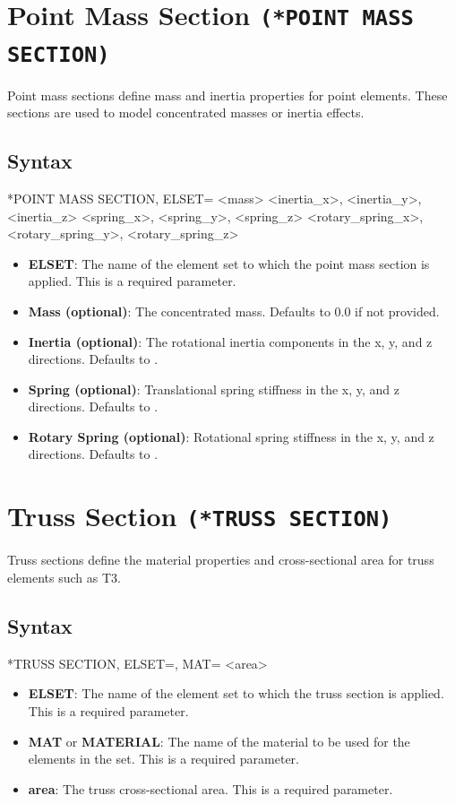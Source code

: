\section{Point Mass Section \texttt{(*POINT MASS SECTION)}}
Point mass sections define mass and inertia properties for point elements. These sections are used to model concentrated masses or inertia effects.

\subsection{Syntax}
\begin{codeBlock}
*POINT MASS SECTION, ELSET=
<mass>
<inertia_x>, <inertia_y>, <inertia_z>
<spring_x>, <spring_y>, <spring_z>
<rotary_spring_x>, <rotary_spring_y>, <rotary_spring_z>
\end{codeBlock}

\begin{itemize}
\item \textbf{ELSET}: The name of the element set to which the point mass section is applied. This is a required parameter.
\item \textbf{Mass (optional)}: The concentrated mass. Defaults to 0.0 if not provided.
\item \textbf{Inertia (optional)}: The rotational inertia components in the x, y, and z directions. Defaults to .
\item \textbf{Spring (optional)}: Translational spring stiffness in the x, y, and z directions. Defaults to .
\item \textbf{Rotary Spring (optional)}: Rotational spring stiffness in the x, y, and z directions. Defaults to .
\end{itemize}

\section{Truss Section \texttt{(*TRUSS SECTION)}}
Truss sections define the material properties and cross-sectional area for truss elements such as T3.

\subsection{Syntax}
\begin{codeBlock}
*TRUSS SECTION, ELSET=, MAT=
<area>
\end{codeBlock}

\begin{itemize}
\item \textbf{ELSET}: The name of the element set to which the truss section is applied. This is a required parameter.
\item \textbf{MAT} or \textbf{MATERIAL}: The name of the material to be used for the elements in the set. This is a required parameter.
\item \textbf{area}: The truss cross-sectional area. This is a required parameter.
\end{itemize}

